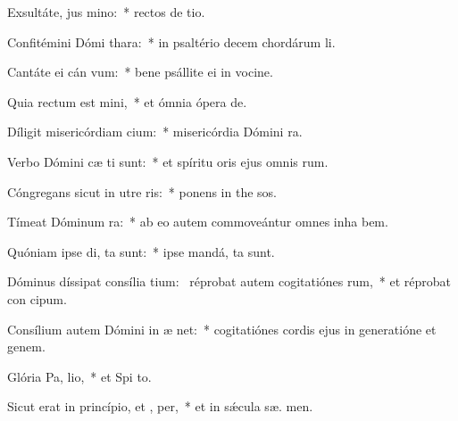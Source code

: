 \item Exsultáte, jus  mino:~* rectos de tio.
\item Confitémini Dómi  thara:~* in psaltério decem chordárum  li.
\item Cantáte ei cán vum:~* bene psállite ei in vocine.
\item Quia rectum est  mini,~* et ómnia ópera   de.
\item Díligit misericórdiam  cium:~* misericórdia Dómini   ra.
\item Verbo Dómini cæ ti sunt:~* et spíritu oris ejus omnis  rum.
\item Cóngregans sicut in utre  ris:~* ponens in the sos.
\item Tímeat Dóminum  ra:~* ab eo autem commoveántur omnes inha bem.
\item Quóniam ipse di,  ta sunt:~* ipse mandá,  ta sunt.
\item Dóminus díssipat consília tium:~\pscross{} réprobat autem cogitatiónes rum,~* et réprobat con cipum.
\item Consílium autem Dómini in æ net:~* cogitatiónes cordis ejus in generatióne et genem.
\item Glória Pa,  lio,~* et Spi to.
\item Sicut erat in princípio, et ,  per,~* et in sǽcula sæ. men.
